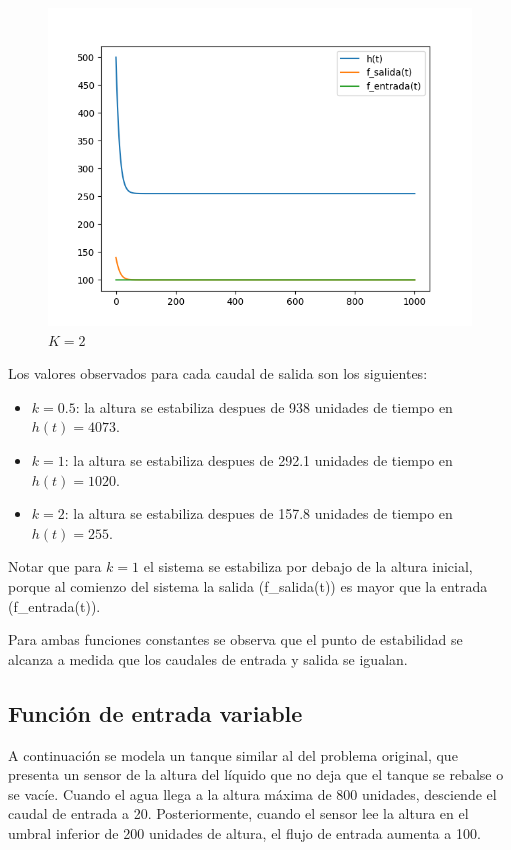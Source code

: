 \documentclass[12pt]{article}
\begin{document}
\begin{figure}[h]
\begin{minipage}{0.32\textwidth}
		\includegraphics[width=\linewidth]{c100k2}
		\caption{$K = 2$}
		\label{gr:c100k2}
	\end{minipage}
\end{figure}

Los valores observados para cada caudal de salida son los siguientes:

\begin{itemize}
  \item $k=0.5$: la altura se estabiliza despues de 938 unidades de tiempo en $h(t)=4073$.
  \item $k=1$: la altura se estabiliza despues de 292.1 unidades de tiempo en $h(t)=1020$.
  \item $k=2$: la altura se estabiliza despues de 157.8 unidades de tiempo en $h(t)=255$.
\end{itemize}

Notar que para $k=1$ el sistema se estabiliza por debajo de la altura inicial, porque al comienzo del sistema la salida (f\_salida(t)) es mayor que la entrada (f\_entrada(t)).

Para ambas funciones constantes se observa que el punto de estabilidad se alcanza a medida que los caudales de entrada y salida se igualan.


\subsection*{Función de entrada variable}


A continuación se modela un tanque similar al del problema original, que presenta un sensor de la altura del líquido que no deja que el tanque se rebalse o se vacíe. Cuando el agua llega a la altura máxima de 800 unidades, desciende el caudal de entrada a 20. Posteriormente, cuando el sensor lee la altura en el umbral inferior de 200 unidades de altura, el flujo de entrada aumenta a 100.
\end{document}
